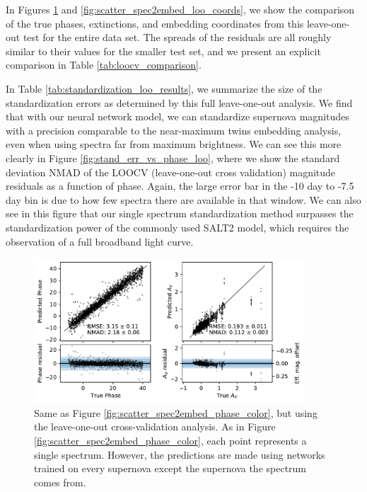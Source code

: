 In Figures \ref{fig:scatter_spec2embed_loo_phase_color} and \ref{fig:scatter_spec2embed_loo_coords}, we show the comparison of the true phases, extinctions, and embedding coordinates from this leave-one-out test for the entire data set. The spreads of the residuals are all roughly similar to their values for the smaller test set, and we present an explicit comparison in Table \ref{tab:loocv_comparison}.

In Table \ref{tab:standardization_loo_results}, we summarize the size of the standardization errors as determined by this full leave-one-out analysis. We find that with our neural network model, we can standardize supernova magnitudes with a precision comparable to the near-maximum twins embedding analysis, even when using spectra far from maximum brightness. We can see this more clearly in Figure \ref{fig:stand_err_vs_phase_loo}, where we show the standard deviation NMAD of the LOOCV (leave-one-out cross validation) magnitude residuals as a function of phase. Again, the large error bar in the -10 day to -7.5 day bin is due to how few spectra there are available in that window. We can also see in this figure that our single spectrum standardization method surpasses the standardization power of the commonly used SALT2 model, which requires the observation of a full broadband light curve.  

\begin{figure}
    \centering
    \includegraphics[width=0.9\textwidth]{figures/nn_twins/scatter_loo_spec2embed_phase_color_mag.pdf}
    \caption{Same as Figure \ref{fig:scatter_spec2embed_phase_color}, but using the leave-one-out cross-validation analysis. As in Figure \ref{fig:scatter_spec2embed_phase_color}, each point represents a single spectrum. However, the predictions are made using networks trained on every supernova except the supernova the spectrum comes from.}
    \label{fig:scatter_spec2embed_loo_phase_color}
\end{figure}

